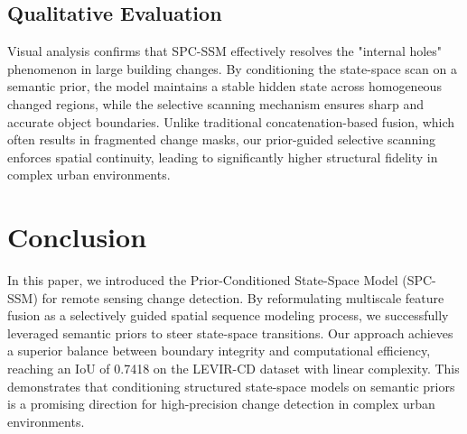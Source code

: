 \documentclass[10pt,conference]{IEEEtran}
\begin{document}
\subsection{Qualitative Evaluation}
Visual analysis confirms that SPC-SSM effectively resolves the "internal holes" phenomenon in large building changes. By conditioning the state-space scan on a semantic prior, the model maintains a stable hidden state across homogeneous changed regions, while the selective scanning mechanism ensures sharp and accurate object boundaries. Unlike traditional concatenation-based fusion, which often results in fragmented change masks, our prior-guided selective scanning enforces spatial continuity, leading to significantly higher structural fidelity in complex urban environments.

\section{Conclusion}
In this paper, we introduced the Prior-Conditioned State-Space Model (SPC-SSM) for remote sensing change detection. By reformulating multiscale feature fusion as a selectively guided spatial sequence modeling process, we successfully leveraged semantic priors to steer state-space transitions. Our approach achieves a superior balance between boundary integrity and computational efficiency, reaching an IoU of 0.7418 on the LEVIR-CD dataset \cite{chen2020spatial} with linear complexity. This demonstrates that conditioning structured state-space models on semantic priors is a promising direction for high-precision change detection in complex urban environments.



\end{document}
